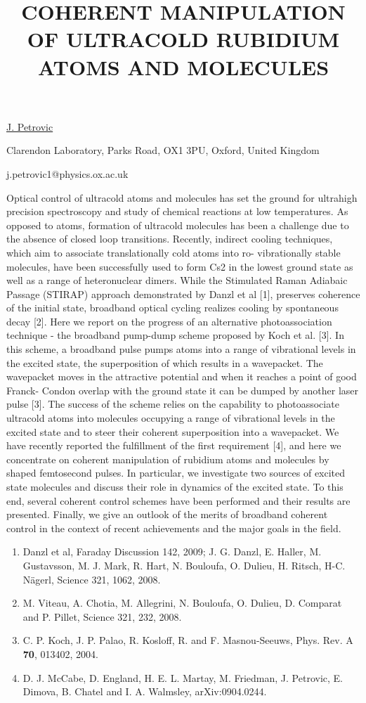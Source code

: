 \title{COHERENT MANIPULATION OF ULTRACOLD RUBIDIUM ATOMS AND MOLECULES}

\underline{J. Petrovic} 

\vspace{-4mm}
{\normalsize{Clarendon Laboratory, Parks Road, OX1 3PU, Oxford, United Kingdom

\email j.petrovic1@physics.ox.ac.uk}}

Optical control of ultracold atoms and molecules has set the ground for ultrahigh precision spectroscopy and study of chemical
reactions at low temperatures. As opposed to atoms, formation of ultracold molecules has been a challenge  due to the absence
of closed loop transitions. Recently, indirect cooling techniques, which aim to associate translationally cold atoms into ro-
vibrationally stable molecules, have been successfully used to form Cs2 in the lowest ground state as well as a range of
heteronuclear dimers. While the Stimulated Raman Adiabaic Passage (STIRAP) approach demonstrated by Danzl et al [1],
preserves coherence of the initial state, broadband optical cycling realizes cooling by spontaneous decay [2]. Here we report on
the progress of an alternative photoassociation technique - the broadband pump-dump scheme proposed by Koch et al. [3].
In this scheme, a broadband pulse pumps atoms into a range of vibrational levels in the excited state, the superposition of
which results in a wavepacket. The wavepacket moves in the attractive potential and when it reaches a point of good Franck-
Condon overlap with the ground state it can be dumped by another laser pulse [3]. The success of the scheme relies on the
capability to photoassociate ultracold atoms into molecules occupying a range of vibrational levels in the excited state and to
steer their coherent superposition into a wavepacket. We have recently reported the fulfillment of the first requirement [4], and
here we concentrate on coherent manipulation of rubidium atoms and molecules by shaped femtosecond pulses. In particular, we
investigate two sources of excited state molecules and discuss their role in dynamics of the excited state. To this end, several
coherent control schemes have been performed and their results are presented. Finally, we give an outlook of the merits of
broadband coherent control in the context of recent achievements and the major goals in the field.

\vspace{-4mm} {\normalsize \begin{enumerate}
\item Danzl et al, Faraday Discussion 142, 2009; J. G. Danzl, E. Haller, M. Gustavsson, M. J.
Mark, R. Hart, N. Bouloufa, O. Dulieu, H. Ritsch, H-C. N\"{a}gerl,
Science 321, 1062, 2008.
\item M. Viteau, A. Chotia, M. Allegrini, N. Bouloufa, O. Dulieu, D. Comparat and P. Pillet, Science 321, 232,
2008.
\item C. P. Koch, J. P. Palao, R. Kosloff, R. and F. Masnou-Seeuws, Phys. Rev. A \textbf{70}, 013402, 2004.
\item D. J. McCabe, D. England, H. E. L. Martay, M.
Friedman, J. Petrovic, E. Dimova, B. Chatel and I. A. Walmsley,
arXiv:0904.0244.
\end{enumerate}
}

\vspace{\baselineskip}